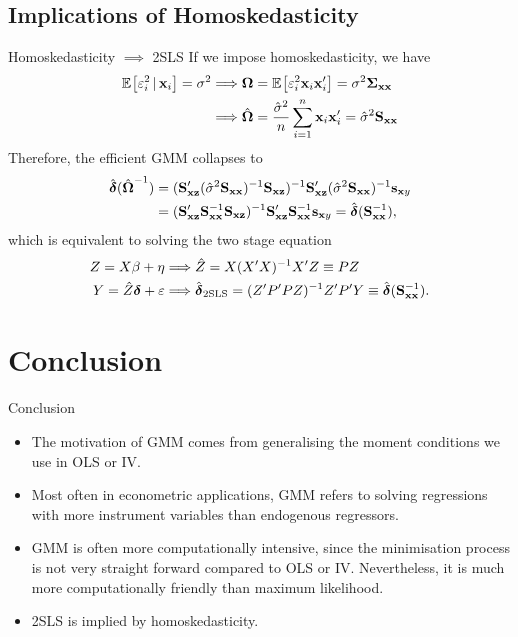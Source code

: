 \documentclass{beamer}
\begin{document}
\subsection{Implications of Homoskedasticity}

\begin{frame}{Homoskedasticity $\implies$ 2SLS}
	If we impose homoskedasticity, we have
	\begin{align*}
		\operatorname{\mathbb{E}}_{}\!\left[\varepsilon_i^2\,|\,\mathbf{x}_i\right] = \sigma^2
		&\Longrightarrow \boldsymbol{\Omega} = \operatorname{\mathbb{E}}_{}\!\left[\varepsilon_i^2\mathbf{x}_i\mathbf{x}_i'\right] = \sigma^2\boldsymbol{\Sigma}_{\mathbf{x}\mathbf{x}} \\
		&\Longrightarrow \hat{\boldsymbol{\Omega}} = \frac{\hat{\sigma}^2}{n}\sum_{i=1}^{n}\mathbf{x}_i\mathbf{x}_i' = \hat{\sigma}^2\mathbf{S}_{\mathbf{x}\mathbf{x}}
	\end{align*}
	Therefore, the efficient GMM collapses to
	\begin{align*}
		\hat{\boldsymbol{\delta}}(\hat{\boldsymbol{\Omega}}^{-1})
		&= (\mathbf{S}_{\mathbf{x}\mathbf{z}}'(\hat{\sigma}^2\mathbf{S}_{\mathbf{x}\mathbf{x}})^{-1}\mathbf{S}_{\mathbf{x}\mathbf{z}})^{-1}\mathbf{S}_{\mathbf{x}\mathbf{z}}'
		(\hat{\sigma}^2\mathbf{S}_{\mathbf{x}\mathbf{x}})^{-1}\mathbf{s}_{\mathbf{x} y} \\
		&= (\mathbf{S}_{\mathbf{x}\mathbf{z}}'\mathbf{S}_{\mathbf{x}\mathbf{x}}^{-1}\mathbf{S}_{\mathbf{x}\mathbf{z}})^{-1}\mathbf{S}_{\mathbf{x}\mathbf{z}}'\mathbf{S}_{\mathbf{x}\mathbf{x}}^{-1}\mathbf{s}_{\mathbf{x} y}
		= \hat{\boldsymbol{\delta}}(\mathbf{S}_{\mathbf{x}\mathbf{x}}^{-1}),
	\end{align*}
	which is equivalent to solving the two stage equation
	\begin{align}
		Z = X\beta + \eta &\Longrightarrow \hat{Z} = X(X'X)^{-1} X'Z \equiv PZ \\
		Y = \hat{Z}\boldsymbol{\delta} + \varepsilon &\Longrightarrow \hat{\boldsymbol{\delta}}_{\text{2SLS}}
			= (Z'P'PZ)^{-1}{Z'P'Y}
			\equiv \hat{\boldsymbol{\delta}}(\mathbf{S}_{\mathbf{x}\mathbf{x}}^{-1}).
	\end{align}
\end{frame}

\section{Conclusion}

\begin{frame}{Conclusion}
	\begin{itemize}
		\item
			The motivation of GMM comes from generalising the moment conditions
			we use in OLS or IV.
		\item
			Most often in econometric applications, GMM refers to solving
			regressions with more instrument variables than endogenous regressors.
		\item
			GMM is often more computationally intensive, since the minimisation
			process is not very straight forward compared to OLS or IV.
			Nevertheless, it is much more computationally friendly than maximum likelihood.
		\item
			2SLS is implied by homoskedasticity.
	\end{itemize}
\end{frame}
\end{document}
